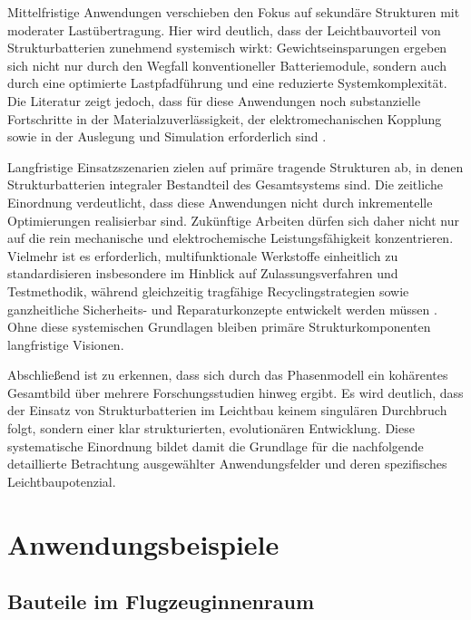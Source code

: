 Mittelfristige Anwendungen verschieben den Fokus auf sekundäre Strukturen mit moderater Lastübertragung. Hier wird deutlich, dass der Leichtbauvorteil von Strukturbatterien zunehmend systemisch wirkt: Gewichtseinsparungen ergeben sich nicht nur durch den Wegfall konventioneller Batteriemodule, sondern auch durch eine optimierte Lastpfadführung und eine reduzierte Systemkomplexität. Die Literatur zeigt jedoch, dass für diese Anwendungen noch substanzielle Fortschritte in der Materialzuverlässigkeit, der elektromechanischen Kopplung sowie in der Auslegung und Simulation erforderlich sind \cite{Johannisson2019,Nie2023}.

Langfristige Einsatzszenarien zielen auf primäre tragende Strukturen ab, in denen Strukturbatterien integraler Bestandteil des Gesamtsystems sind. Die zeitliche Einordnung verdeutlicht, dass diese Anwendungen nicht durch inkrementelle Optimierungen realisierbar sind. Zukünftige Arbeiten dürfen sich daher nicht nur auf die rein mechanische und elektrochemische Leistungsfähigkeit konzentrieren. Vielmehr ist es erforderlich, multifunktionale Werkstoffe einheitlich zu standardisieren insbesondere im Hinblick auf Zulassungsverfahren und Testmethodik, während gleichzeitig tragfähige Recyclingstrategien sowie ganzheitliche Sicherheits- und Reparaturkonzepte entwickelt werden müssen \cite{Asp2021a,Kuehnelt2021}. Ohne diese systemischen Grundlagen bleiben primäre Strukturkomponenten langfristige Visionen.

Abschließend ist zu erkennen, dass sich durch das Phasenmodell ein kohärentes Gesamtbild über mehrere Forschungsstudien hinweg ergibt. Es wird deutlich, dass der Einsatz von Strukturbatterien im Leichtbau keinem singulären Durchbruch folgt, sondern einer klar strukturierten, evolutionären Entwicklung. Diese systematische Einordnung bildet damit die Grundlage für die nachfolgende detaillierte Betrachtung ausgewählter Anwendungsfelder und deren spezifisches Leichtbaupotenzial.

\section{Anwendungsbeispiele}
\subsection{Bauteile im Flugzeuginnenraum}

